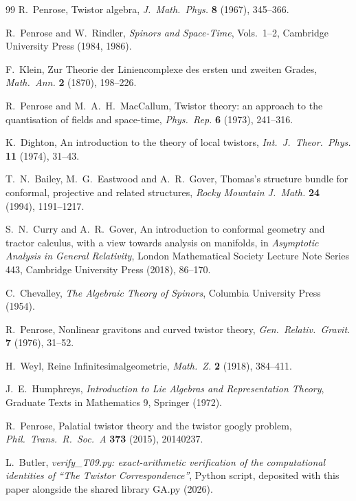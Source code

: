 \documentclass[11pt]{article}
\theoremstyle{definition}
\begin{document}
\begin{thebibliography}{99}
R.~Penrose,
Twistor algebra,
\emph{J.\ Math.\ Phys.} \textbf{8} (1967), 345--366.

R.~Penrose and W.~Rindler,
\emph{Spinors and Space-Time}, Vols.~1--2,
Cambridge University Press (1984, 1986).

F.~Klein,
Zur Theorie der Liniencomplexe des ersten und zweiten Grades,
\emph{Math.\ Ann.} \textbf{2} (1870), 198--226.

R.~Penrose and M.~A.~H.~MacCallum,
Twistor theory: an approach to the quantisation of fields and space-time,
\emph{Phys.\ Rep.} \textbf{6} (1973), 241--316.

K.~Dighton,
An introduction to the theory of local twistors,
\emph{Int.\ J.\ Theor.\ Phys.} \textbf{11} (1974), 31--43.

T.~N.~Bailey, M.~G.~Eastwood and A.~R.~Gover,
Thomas's structure bundle for conformal, projective and related structures,
\emph{Rocky Mountain J.\ Math.} \textbf{24} (1994), 1191--1217.

S.~N.~Curry and A.~R.~Gover,
An introduction to conformal geometry and tractor calculus, with a view towards analysis on manifolds,
in \emph{Asymptotic Analysis in General Relativity},
London Mathematical Society Lecture Note Series 443, Cambridge University Press (2018), 86--170.

C.~Chevalley,
\emph{The Algebraic Theory of Spinors},
Columbia University Press (1954).

R.~Penrose,
Nonlinear gravitons and curved twistor theory,
\emph{Gen.\ Relativ.\ Gravit.} \textbf{7} (1976), 31--52.

H.~Weyl,
Reine Infinitesimalgeometrie,
\emph{Math.\ Z.} \textbf{2} (1918), 384--411.

J.~E.~Humphreys,
\emph{Introduction to Lie Algebras and Representation Theory},
Graduate Texts in Mathematics 9, Springer (1972).

R.~Penrose,
Palatial twistor theory and the twistor googly problem,
\emph{Phil.\ Trans.\ R.\ Soc.\ A} \textbf{373} (2015), 20140237.

L.~Butler,
\emph{verify\_T09.py: exact-arithmetic verification of the computational identities of ``The Twistor Correspondence''},
Python script, deposited with this paper alongside the shared library GA.py (2026).

\end{thebibliography}
\end{document}
